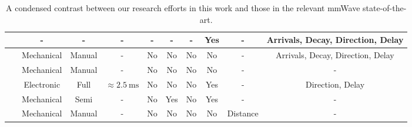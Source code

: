\documentclass[12pt, draftcls, onecolumn]{IEEEtran}
\begin{document}
\begin{table}
\begin{tabular}{|*{10}{c|}}
    \hline
   ~\cite{Indoor60G} & - & - & - & - & - & - & Yes & - & Arrivals, Decay, Direction, Delay\\
    \hline
   ~\cite{QDC_NIST} & Mechanical & Manual & - & No & No & No & No & - & Arrivals, Decay, Direction, Delay\\
    \hline
   ~\cite{D2DHumanBlockage} & Mechanical & Manual & - & No & No & No & No & - & -\\
    \hline
   ~\cite{DopplerHST} & Electronic & Full & ${\approx}\SI{2.5}{\milli\second}$ & No & No & No & Yes & - & Direction, Delay\\
    \hline
   ~\cite{V2XBlockages} & Mechanical & Semi & - & No & Yes & No & Yes & - & -\\
    \hline
   ~\cite{MacCartneyUrbanHumanBlockage} & Mechanical & Manual & - & No & No & No & No & Distance & -\\
    \hline
    \end{tabular}
    \vspace{-1mm}
    \caption{A condensed contrast between our research efforts in this work and those in the relevant mmWave state-of-the-art.}
    \label{T2}
\end{table}
\end{document}
